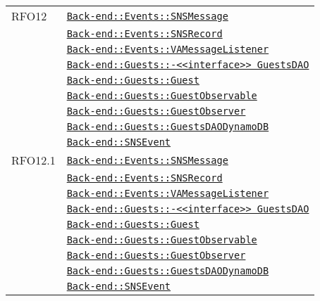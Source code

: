 \begin{longtable}{|>{\centering}m{3cm}|m{10cm}<{\centering}|}
RFO12 & \hyperref[Back-end::Events::SNSMessage]{\texttt{Back-end::Events::SNSMessage}}\\
& \hyperref[Back-end::Events::SNSRecord]{\texttt{Back-end::Events::SNSRecord}}\\
& \hyperref[Back-end::Events::VAMessageListener]{\texttt{Back-end::Events::VAMessageListener}}\\
& \hyperref[Back-end::Guests::<<interface>> GuestsDAO]{\texttt{Back-end::Guests::-\linebreak <<interface>> GuestsDAO}}\\
& \hyperref[Back-end::Guests::Guest]{\texttt{Back-end::Guests::Guest}}\\
& \hyperref[Back-end::Guests::GuestObservable]{\texttt{Back-end::Guests::GuestObservable}}\\
& \hyperref[Back-end::Guests::GuestObserver]{\texttt{Back-end::Guests::GuestObserver}}\\
& \hyperref[Back-end::Guests::GuestsDAODynamoDB]{\texttt{Back-end::Guests::GuestsDAODynamoDB}}\\
& \hyperref[Back-end::SNSEvent]{\texttt{Back-end::SNSEvent}}\\ \hline

RFO12.1 & \hyperref[Back-end::Events::SNSMessage]{\texttt{Back-end::Events::SNSMessage}}\\
& \hyperref[Back-end::Events::SNSRecord]{\texttt{Back-end::Events::SNSRecord}}\\
& \hyperref[Back-end::Events::VAMessageListener]{\texttt{Back-end::Events::VAMessageListener}}\\
& \hyperref[Back-end::Guests::<<interface>> GuestsDAO]{\texttt{Back-end::Guests::-\linebreak <<interface>> GuestsDAO}}\\
& \hyperref[Back-end::Guests::Guest]{\texttt{Back-end::Guests::Guest}}\\
& \hyperref[Back-end::Guests::GuestObservable]{\texttt{Back-end::Guests::GuestObservable}}\\
& \hyperref[Back-end::Guests::GuestObserver]{\texttt{Back-end::Guests::GuestObserver}}\\
& \hyperref[Back-end::Guests::GuestsDAODynamoDB]{\texttt{Back-end::Guests::GuestsDAODynamoDB}}\\
& \hyperref[Back-end::SNSEvent]{\texttt{Back-end::SNSEvent}}\\ \hline


\end{longtable}
